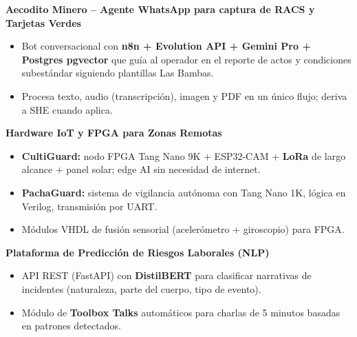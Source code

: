 \documentclass[10pt, a4paper]{article}
\begin{document}
\vspace{1mm}

\textbf{Aecodito Minero -- Agente WhatsApp para captura de RACS y Tarjetas Verdes}
\begin{itemize}
    \item Bot conversacional con \textbf{n8n + Evolution API + Gemini Pro + Postgres pgvector} que guía al operador en el reporte de actos y condiciones subestándar siguiendo plantillas Las Bambas.
    \item Procesa texto, audio (transcripción), imagen y PDF en un único flujo; deriva a SHE cuando aplica.
\end{itemize}

\vspace{1mm}

\textbf{Hardware IoT y FPGA para Zonas Remotas}
\begin{itemize}
    \item \textbf{CultiGuard:} nodo FPGA Tang Nano 9K + ESP32-CAM + \textbf{LoRa} de largo alcance + panel solar; edge AI sin necesidad de internet.
    \item \textbf{PachaGuard:} sistema de vigilancia autónoma con Tang Nano 1K, lógica en Verilog, transmisión por UART.
    \item Módulos VHDL de fusión sensorial (acelerómetro + giroscopio) para FPGA.
\end{itemize}

\vspace{1mm}

\textbf{Plataforma de Predicción de Riesgos Laborales (NLP)}
\begin{itemize}
    \item API REST (FastAPI) con \textbf{DistilBERT} para clasificar narrativas de incidentes (naturaleza, parte del cuerpo, tipo de evento).
    \item Módulo de \textbf{Toolbox Talks} automáticos para charlas de 5 minutos basadas en patrones detectados.
\end{itemize}

\end{document}
